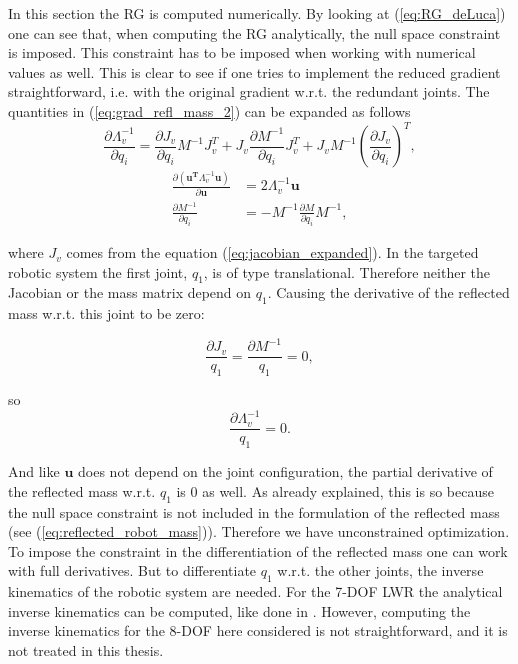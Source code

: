 In this section the RG is computed numerically. By looking at (\ref{eq:RG_deLuca}) one can see that, when computing the RG  analytically, the null space constraint is imposed. This constraint has to be  imposed when working with numerical values as well. This is clear to see if one  tries to  implement the reduced gradient straightforward, i.e. with the original gradient w.r.t. the redundant joints.  The quantities in (\ref{eq:grad_refl_mass_2}) can be expanded as follows
\begin{equation}
\frac{\partial {\Lambda_{v}^{-1}}}{\partial {q_i}} = \frac{\partial {J_v}}{\partial {q_i}} M^{-1} J_v^T + J_v \frac{\partial {M^{-1}}}{\partial {q_i}} J_v^T + J_v M^{-1} \left ( \frac{\partial {J_v}}{\partial {q_i}} \right )^T  ,
\end{equation}
\begin{align}
\frac{\partial {(\mathbf{u^T} \Lambda_{v}^{-1} \mathbf{u})}}{\partial {\mathbf{u}}}& = 2 \Lambda_{v}^{-1} \mathbf{u} \\
\frac{\partial {M^{-1}}}{\partial {q_i}} & = -M^{-1} 
\frac{\partial {M}}{\partial {q_i}} M^{-1},
\end{align}


where $J_v$ comes from the equation (\ref{eq:jacobian_expanded}). In the targeted robotic system the first joint, $q_1$, is of type translational. Therefore neither  the Jacobian or the mass matrix depend on $q_1$. Causing the derivative of the reflected mass w.r.t. this joint to be zero:


\begin{equation}
\frac{\partial {{J_v}}}{q_1} = \frac{\partial {{M^{-1}}}}{q_1} = 0,
\label{eq:j_m_no__q1}
\end{equation}


so 
\begin{equation}
\frac{\partial {{\Lambda_{v}^{-1}}}}{q_1} = 0.
\end{equation}

And like $\mathbf{u}$ does not depend on the joint configuration, the partial derivative of the reflected mass w.r.t. $q_1$ is $0$ as well.
As already explained, this is so because the null space constraint is not included in the formulation of the reflected mass (see  (\ref{eq:reflected_robot_mass})). Therefore we have  unconstrained optimization.  
To impose the constraint in the differentiation of the reflected mass one can work with full derivatives. But to differentiate $q_1$ w.r.t. the other joints, the inverse kinematics of the robotic system are needed. For the 7-DOF LWR the analytical inverse kinematics can be computed, like done in \cite{analyticalInverseKinematicComputation}. However, computing the inverse kinematics for the 8-DOF here considered is not straightforward, and it is not treated in this thesis.


